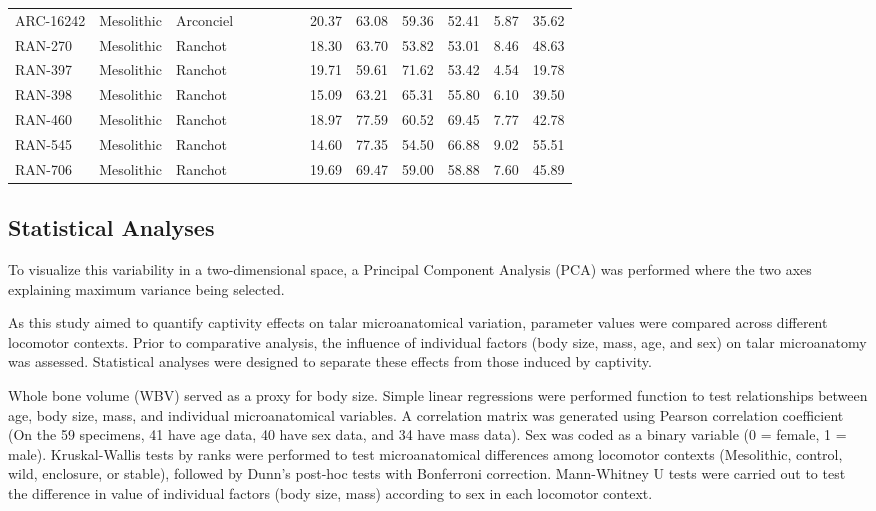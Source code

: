 \documentclass[12pt,a4paper]{article}
\begin{document}
\begin{landscape}
\begin{table}[!htbp]
\begin{tabular}{@{}lllccccccccc@{}}
    ARC-16242 & Mesolithic & Arconciel & ~ & ~ & ~ & 20.37 & 63.08 & 59.36 & 52.41 & 5.87 & 35.62 \\
    RAN-270 & Mesolithic & Ranchot & ~ & ~ & ~ & 18.30 & 63.70 & 53.82 & 53.01 & 8.46 & 48.63 \\
    RAN-397 & Mesolithic & Ranchot & ~ & ~ & ~ & 19.71 & 59.61 & 71.62 & 53.42 & 4.54 & 19.78 \\
    RAN-398 & Mesolithic & Ranchot & ~ & ~ & ~ & 15.09 & 63.21 & 65.31 & 55.80 & 6.10 & 39.50 \\
    RAN-460 & Mesolithic & Ranchot & ~ & ~ & ~ & 18.97 & 77.59 & 60.52 & 69.45 & 7.77 & 42.78 \\
    RAN-545 & Mesolithic & Ranchot & ~ & ~ & ~ & 14.60 & 77.35 & 54.50 & 66.88 & 9.02 & 55.51 \\
    RAN-706 & Mesolithic & Ranchot & ~ & ~ & ~ & 19.69 & 69.47 & 59.00 & 58.88 & 7.60 & 45.89 \\
    \bottomrule
    \end{tabular}
    \end{table}
\end{landscape}

\subsection{Statistical Analyses}

To visualize this variability in a two-dimensional space, a Principal Component Analysis (PCA) was performed where the two axes explaining maximum variance being selected.

As this study aimed to quantify captivity effects on talar microanatomical variation, parameter values were compared across different locomotor contexts. Prior to comparative analysis, the influence of individual factors (body size, mass, age, and sex) on talar microanatomy was assessed. Statistical analyses were designed to separate these effects from those induced by captivity.

Whole bone volume (WBV) served as a proxy for body size. Simple linear regressions were performed function to test relationships between age, body size, mass, and individual microanatomical variables. A correlation matrix was generated using Pearson correlation coefficient (On the 59 specimens, 41 have age data, 40 have sex data, and 34 have mass data). Sex was coded as a binary variable (0 = female, 1 = male).
Kruskal-Wallis tests by ranks were performed to test microanatomical differences among locomotor contexts (Mesolithic, control, wild, enclosure, or stable), followed by Dunn's post-hoc tests with Bonferroni correction. Mann-Whitney U tests were carried out to test the difference in value of individual factors (body size, mass) according to sex in each locomotor context.
\end{document}
